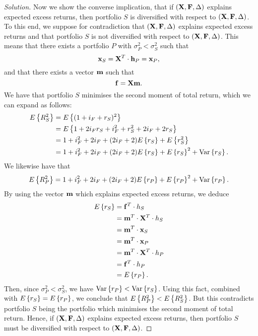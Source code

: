 \begin{proof}[Solution]
Now we show the converse implication, that if $(\mathbf{X}, \mathbf{F}, \Delta)$ explains expected excess returns, then portfolio $S$ is diversified with respect to $(\mathbf{X}, \mathbf{F}, \Delta)$. To this end, we suppose for contradiction that $(\mathbf{X}, \mathbf{F}, \Delta)$ explains expected excess returns and that portfolio $S$ is not diversified with respect to $(\mathbf{X}, \mathbf{F}, \Delta)$. This means that there exists a portfolio $P$ with $\sigma_{P}^{2} < \sigma_{S}^{2}$ such that \[\mathbf{x}_{S} = \mathbf{X}^{T} \cdot \mathbf{h}_{P} = \mathbf{x}_{P},\] and that there exists a vector $\mathbf{m}$ such that \[\mathbf{f} = \mathbf{X}\mathbf{m}.\] We have that portfolio $S$ minimises the second moment of total return, which we can expand as follows:
\begin{align*}
E\left\{R_{S}^{2}\right\} &= E\left\{(1 + i_{F} + r_{S})^{2}\right\}\\
&= E\left\{1 + 2i_{F}r_{S} + i_{F}^{2} + r_{S}^{2} + 2i_{F} + 2r_{S}\right\}\\
&= 1 + i_{F}^{2} + 2i_{F} + (2i_{F} + 2)E\left\{r_{S}\right\} + E\left\{r_{S}^{2}\right\}\\
&= 1 + i_{F}^{2} + 2i_{F} + (2i_{F} + 2)E\left\{r_{S}\right\} + E\left\{r_{S}\right\}^{2} + \mathrm{Var}\left\lbrace r_{S}\right\rbrace.
\end{align*}
We likewise have that \[E\left\{R_{P}^{2}\right\} = 1 + i_{F}^{2} + 2i_{F} + (2i_{F} + 2)E\left\{r_{P}\right\} + E\left\{r_{P}\right\}^{2} + \mathrm{Var}\left\lbrace r_{P}\right\rbrace.\] By using the vector $\mathbf{m}$ which explains expected excess returns, we deduce
\begin{align*}
E\left\{r_{S}\right\} &= \mathbf{f}^{T} \cdot h_{S}\\
&= \mathbf{m}^{T} \cdot \mathbf{X}^{T} \cdot h_{S}\\
&= \mathbf{m}^{T} \cdot \mathbf{x}_{S}\\
&= \mathbf{m}^{T} \cdot \mathbf{x}_{P}\\
&= \mathbf{m}^{T} \cdot \mathbf{X}^{T} \cdot h_{P}\\
&= \mathbf{f}^{T} \cdot h_{P}\\
&= E\left\{r_{P}\right\}.
\end{align*}
Then, since $\sigma_{P}^{2} < \sigma_{S}^{2}$, we have $\mathrm{Var}\left\lbrace r_{P}\right\rbrace < \mathrm{Var}\left\lbrace r_{S}\right\rbrace$. Using this fact, combined with $E\left\{r_{S}\right\} = E\left\{r_{P}\right\}$, we conclude that $E\left\{R_{P}^{2}\right\} < E\left\{R_{S}^{2}\right\}$. But this contradicts portfolio $S$ being the portfolio which minimises the second moment of total return. Hence, if $(\mathbf{X}, \mathbf{F}, \Delta)$ explains expected excess returns, then portfolio $S$ must be diversified with respect to $(\mathbf{X}, \mathbf{F}, \Delta)$.
\end{proof}
